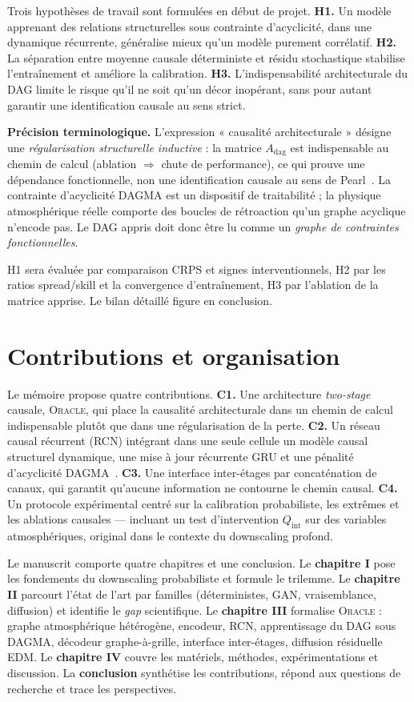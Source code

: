 \documentclass[14pt,a4paper,openany]{extreport}
\newcommand{\Oracle}{\textsc{Oracle}}
\newcommand{\Adag}{\ensuremath{A_{\mathrm{dag}}}}
\begin{document}
Trois hypothèses de travail sont formulées en début de projet. \textbf{H1.} Un modèle apprenant des relations structurelles sous contrainte d'acyclicité, dans une dynamique récurrente, généralise mieux qu'un modèle purement corrélatif. \textbf{H2.} La séparation entre moyenne causale déterministe et résidu stochastique stabilise l'entraînement et améliore la calibration. \textbf{H3.} L'indispensabilité architecturale du DAG limite le risque qu'il ne soit qu'un décor inopérant, sans pour autant garantir une identification causale au sens strict.

\noindent\textbf{Précision terminologique.} L'expression « causalité architecturale » désigne une \emph{régularisation structurelle inductive} : la matrice $\Adag$ est indispensable au chemin de calcul (ablation $\Rightarrow$ chute de performance), ce qui prouve une dépendance fonctionnelle, non une identification causale au sens de Pearl~\cite{pearl_causality_2009}. La contrainte d'acyclicité DAGMA est un dispositif de traitabilité ; la physique atmosphérique réelle comporte des boucles de rétroaction qu'un graphe acyclique n'encode pas. Le DAG appris doit donc être lu comme un \emph{graphe de contraintes fonctionnelles}.

H1 sera évaluée par comparaison CRPS et signes interventionnels, H2 par les ratios spread/skill et la convergence d'entraînement, H3 par l'ablation de la matrice apprise. Le bilan détaillé figure en conclusion.

\section*{Contributions et organisation}

Le mémoire propose quatre contributions. \textbf{C1.} Une architecture \emph{two-stage} causale, \Oracle{}, qui place la causalité architecturale dans un chemin de calcul indispensable plutôt que dans une régularisation de la perte. \textbf{C2.} Un réseau causal récurrent (RCN) intégrant dans une seule cellule un modèle causal structurel dynamique, une mise à jour récurrente GRU et une pénalité d'acyclicité DAGMA~\cite{bello_dagma_2022}. \textbf{C3.} Une interface inter-étages par concaténation de canaux, qui garantit qu'aucune information ne contourne le chemin causal. \textbf{C4.} Un protocole expérimental centré sur la calibration probabiliste, les extrêmes et les ablations causales --- incluant un test d'intervention $Q_{\mathrm{int}}$ sur des variables atmosphériques, original dans le contexte du downscaling profond.

Le manuscrit comporte quatre chapitres et une conclusion. Le \textbf{chapitre I} pose les fondements du downscaling probabiliste et formule le trilemme. Le \textbf{chapitre II} parcourt l'état de l'art par familles (déterministes, GAN, vraisemblance, diffusion) et identifie le \emph{gap} scientifique. Le \textbf{chapitre III} formalise \Oracle{} : graphe atmosphérique hétérogène, encodeur, RCN, apprentissage du DAG sous DAGMA, décodeur graphe-à-grille, interface inter-étages, diffusion résiduelle EDM. Le \textbf{chapitre IV} couvre les matériels, méthodes, expérimentations et discussion. La \textbf{conclusion} synthétise les contributions, répond aux questions de recherche et trace les perspectives.
\end{document}
